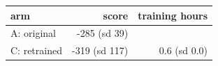 \begin{tabular}{lrr}
\toprule
arm & score & training hours \\
\midrule
A: original & -285 (sd 39) &  \\
C: retrained & -319 (sd 117) & 0.6 (sd 0.0) \\
\bottomrule
\end{tabular}
